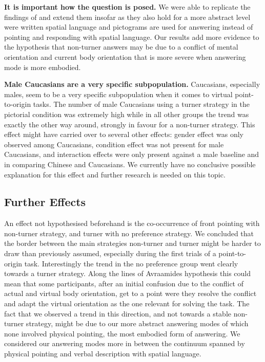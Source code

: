 \documentclass{frontiersSCNS} %
\begin{document}
\textbf{It is important how the question is posed.}
We were able to replicate the findings of \citep{Avraamides2004} and extend them insofar as they also hold for a more abstract level were written spatial language and pictograms are used for answering instead of pointing and responding with spatial language. Our results add more evidence to the hypothesis that non-turner answers may be due to a conflict of mental orientation and current body orientation that is more severe when answering mode is more embodied.

\textbf{Male Caucasians are a very specific subpopulation.}
Caucasians, especially males, seem to be a very specific subpopulation when it comes to virtual point-to-origin tasks. The number of male Caucasians using a turner strategy in the pictorial condition was extremely high while in all other groups the trend was exactly the other way around, strongly in favour for a non-turner strategy. This effect might have carried over to several other effects: gender effect was only observed among Caucasians, condition effect was not present for male Caucasians, and interaction effects were only present against a male baseline and in comparing Chinese and Caucasians.  We currently have no conclusive possible explanation for this effect and further research is needed on this topic.

\subsection{Further Effects}
An effect not hypothesised beforehand is the co-occurrence of front pointing with non-turner strategy, and turner with no preference strategy. We concluded that the border between the main strategies non-turner and turner might be harder to draw than previously assumed, especially during the first trials of a point-to-origin task. Interestingly the trend in the no preference group went clearly towards a turner strategy. Along the lines of Avraamides hypothesis this could mean that some participants, after an initial confusion due to the conflict of actual and virtual body orientation, get to a point were they resolve the conflict and adapt the virtual orientation as the one relevant for solving the task. The fact that we observed a trend in this direction, and not towards a stable non-turner strategy, might be due to our more abstract answering modes of which none involved physical pointing, the most embodied form of answering. We considered our answering modes more in between the continuum spanned by physical pointing and verbal description with spatial language.
\end{document}
